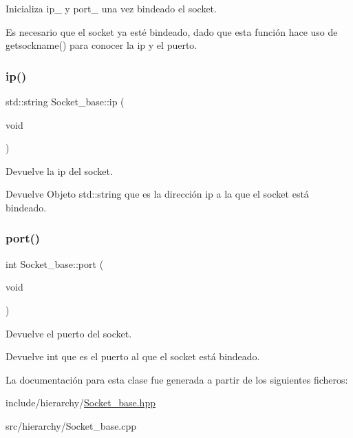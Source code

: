 Inicializa ip\+\_\+ y port\+\_\+ una vez bindeado el socket. 

Es necesario que el socket ya esté bindeado, dado que esta función hace uso de getsockname() para conocer la ip y el puerto. \mbox{\label{classSocket__base_aed490170422026c6dfe5def12031cd04}} 
\subsubsection{\texorpdfstring{ip()}{ip()}}
{\footnotesize\ttfamily std\+::string Socket\+\_\+base\+::ip (\begin{DoxyParamCaption}\item[{void}]{ }\end{DoxyParamCaption})}



Devuelve la ip del socket. 

\begin{DoxyReturn}{Devuelve}
Objeto std\+::string que es la dirección ip a la que el socket está bindeado. 
\end{DoxyReturn}
\mbox{\label{classSocket__base_afcdd7ae81a9fb867d012b7db8c259576}} 
\subsubsection{\texorpdfstring{port()}{port()}}
{\footnotesize\ttfamily int Socket\+\_\+base\+::port (\begin{DoxyParamCaption}\item[{void}]{ }\end{DoxyParamCaption})}



Devuelve el puerto del socket. 

\begin{DoxyReturn}{Devuelve}
int que es el puerto al que el socket está bindeado. 
\end{DoxyReturn}


La documentación para esta clase fue generada a partir de los siguientes ficheros\+:\begin{DoxyCompactItemize}
\item 
include/hierarchy/\hyperlink{Socket__base_8hpp}{Socket\+\_\+base.\+hpp}\item 
src/hierarchy/Socket\+\_\+base.\+cpp\end{DoxyCompactItemize}
